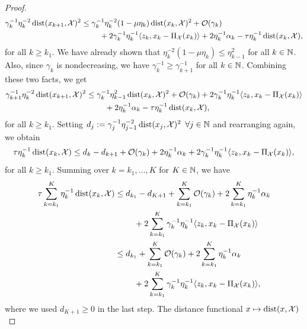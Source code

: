 \begin{proof}
\begin{align*}
        \gamma_k^{-1}\eta_k^{-2} \operatorname{dist}(x_{k+1}, \mathcal{X})^2 &\leq
        \gamma_k^{-1}\eta_k^{-2}(1-\mu\eta_k)\operatorname{dist}(x_k, \mathcal{X})^2
            + \mathcal{O}(\gamma_k) \\
            &\phantom{===}
            + 2\gamma_k^{-1}\eta_k^{-1} \langle z_k, x_k - \operatorname{\Pi_\mathcal{X}}(x_k) \rangle
            + 2\eta_k^{-1}\alpha_k - \tau \eta_k^{-1} \operatorname{dist}(x_k, \mathcal{X}),
    \end{align*}
    for all $k \geq k_1$.
    We have already shown that $\eta_k^{-2} (1 - \mu\eta_k) \leq \eta_{k-1}^2$ for all $k\in\mathbb{N}$.
    Also, since $\gamma_k$ is nondecreasing, we have $\gamma_k^{-1} \geq \gamma_{k+1}^{-1}$ for all $k\in\mathbb{N}$.
    Combining these two facts, we get
    \begin{align*}
        \gamma_{k+1}^{-1}\eta_k^{-2} \operatorname{dist}(x_{k+1}, \mathcal{X})^2
        &\leq
        \gamma_k^{-1}\eta_{k-1}^2 \operatorname{dist}(x_k, \mathcal{X})^2
            + \mathcal{O}(\gamma_k) + 2\gamma_k^{-1}\eta_k^{-1} \langle z_k, x_k - \operatorname{\Pi_\mathcal{X}}(x_k) \rangle \\
            &\phantom{===}
            + 2\eta_k^{-1}\alpha_k - \tau \eta_k^{-1} \operatorname{dist}(x_k, \mathcal{X}),
    \end{align*}
    for all $k\geq k_1$.
    Setting $d_j := \gamma_j^{-1} \eta_{j-1}^{-2} \operatorname{dist}(x_j, \mathcal{X})^2 \enspace \forall j\in\mathbb{N}$ and rearranging again, we obtain
    \[
        \tau \eta_k^{-1} \operatorname{dist}(x_k, \mathcal{X})
        \leq
        d_k - d_{k+1}
            + \mathcal{O}(\gamma_k)
            + 2\eta_k^{-1}\alpha_k
            + 2\gamma_k^{-1}\eta_k^{-1} \langle z_k, x_k - \operatorname{\Pi_\mathcal{X}}(x_k) \rangle,
    \]
    for all $k\geq k_1$. Summing over $k=k_1,\dots, K$ for $K\in\mathbb{N}$, we have
    \begin{align*}
        \tau \sum_{k=k_1}^{K} \eta_k^{-1} \operatorname{dist}(x_k, \mathcal{X})
        &\leq
        d_{k_1} - d_{K+1} + \sum_{k=k_1}^{K} \mathcal{O}(\gamma_k)
            + 2 \sum_{k=k_1}^{K}\eta_k^{-1}\alpha_k \\
        &\phantom{===} + 2\sum_{k=k_1}^K \gamma_k^{-1}\eta_k^{-1} \langle z_k, x_k - \operatorname{\Pi_\mathcal{X}}(x_k) \rangle \\
        &\leq
        d_{k_1} + \sum_{k=k_1}^{K} \mathcal{O}(\gamma_k)
            + 2 \sum_{k=k_1}^{K}\eta_k^{-1}\alpha_k \\
        &\phantom{===} + 2\sum_{k=k_1}^K \gamma_k^{-1}\eta_k^{-1} \langle z_k, x_k - \operatorname{\Pi_\mathcal{X}}(x_k) \rangle,
    \end{align*}
    where we used $d_{K+1} \geq 0$ in the last step.
    The distance functional $x\mapsto\operatorname{dist}(x,\mathcal{X})$

\end{proof}

